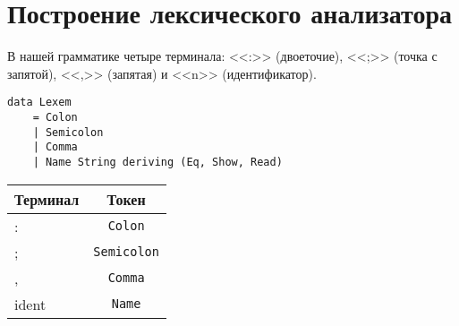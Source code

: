 \section{Построение лексического анализатора}

В нашей грамматике четыре терминала: <<:>> (двоеточие), <<;>> (точка с запятой),
<<,>> (запятая) и <<n>> (идентификатор).

\begin{verbatim}
data Lexem 
    = Colon
    | Semicolon
    | Comma
    | Name String deriving (Eq, Show, Read)
\end{verbatim}

\begin{tabular}{| l | c |}
    \hline
    \textbf{Терминал} & \textbf{Токен} \\
    \hline
    : & \verb+Colon+ \\
    \hline
    ; & \verb+Semicolon+ \\
    \hline
    , & \verb+Comma+ \\
    \hline
    ident & \verb+Name+ \\
    \hline
\end{tabular}

